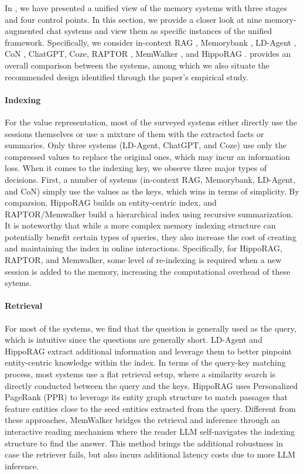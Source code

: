 In , we have presented a unified view of the memory systems with three stages and four control points. In this section, we provide a closer look at nine memory-augmented chat systems and view them as specific instances of the unified framework. Specifically, we consider in-context RAG \citep{shi-etal-2024-replug}, Memorybank \citep{zhong2024memorybank}, LD-Agent \citep{DBLP:journals/corr/abs-2406-05925}, CoN \citep{yu2023chain}, ChatGPT, Coze, RAPTOR \citep{DBLP:conf/iclr/SarthiATKGM24}, MemWalker \citep{DBLP:journals/corr/abs-2310-05029}, and HippoRAG \citep{DBLP:journals/corr/abs-2405-14831}.  provides an overall comparison between the systems, among which we also situate the recommended design identified through the paper's empirical study.

\paragraph{Indexing} For the value representation, most of the surveyed systems either directly use the sessions themselves or use a mixture of them with the extracted facts or summaries. Only three systems (LD-Agent, ChatGPT, and Coze) use only the compressed values to replace the original ones, which may incur an information loss. When it comes to the indexing key, we observe three major types of decisions. First, a number of systems (in-context RAG, Memorybank, LD-Agent, and CoN) simply use the values as the keys, which wins in terms of simplicity. By comparsion, HippoRAG builds an entity-centric index, and RAPTOR/Memwalker build a hierarchical index using recursive summarization. It is noteworthy that while a more complex memory indexing structure can potentially benefit certain types of queries, they also increase the cost of creating and maintaining the index in online interactions. Specifically, for HippoRAG, RAPTOR, and Memwalker, some level of re-indexing is required when a new session is added to the memory, increasing the computational overhead of these sytems. 


\paragraph{Retrieval} For most of the systems, we find that the question is generally used as the query, which is intuitive since the questions are generally short. LD-Agent and HippoRAG extract additional information and leverage them to better pinpoint entity-centric knowledge within the index. In terms of the query-key matching process, most systems use a flat retrieval setup, where a similarity search is directly conducted between the query and the keys. HippoRAG uses Personalized PageRank (PPR) to leverage its entity graph structure to match passages that feature entities close to the seed entities extracted from the query. Different from these approaches, MemWalker bridges the retrieval and inference through an interactive reading mechanism where the reader LLM self-navigates the indexing structure to find the answer. This method brings the additional robustness in case the retriever fails, but also incurs additional latency costs due to more LLM inference.


